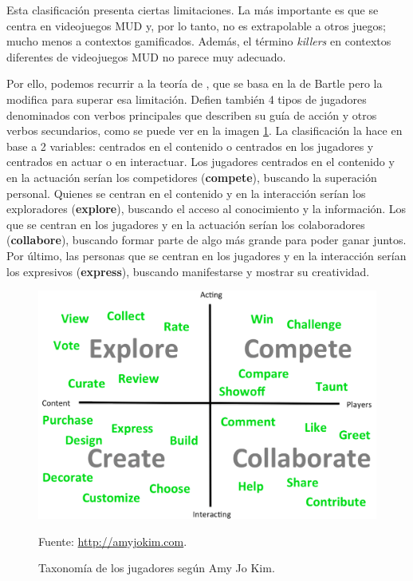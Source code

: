 Esta clasificación presenta ciertas limitaciones. 
%
La más importante es que se centra en videojuegos \gls{MUD} y, por lo tanto, no es extrapolable a otros juegos; mucho menos a contextos gamificados.
%
Además, el término \textit{killers} en contextos diferentes de videojuegos \gls{MUD} no parece muy adecuado.


%
Por ello, podemos recurrir a la teoría de \cite{AmyJoKim}, que se basa en la de Bartle pero la modifica para superar esa limitación.
%
Defien también 4 tipos de jugadores denominados con verbos principales que describen su guía de acción y otros verbos secundarios, como se puede ver en la imagen \ref{fig::AmyJoKim}.
%
La clasificación la hace en base a 2 variables: centrados en el contenido o centrados en los jugadores y centrados en actuar o en interactuar.
%
Los jugadores centrados en el contenido y en la actuación serían los competidores (\textbf{compete}), buscando la superación personal.
%
Quienes se centran en el contenido y en la interacción serían los exploradores (\textbf{explore}), buscando el acceso al conocimiento y la información.
%
Los que se centran en los jugadores y en la actuación serían los colaboradores (\textbf{collabore}), buscando formar parte de algo más grande para poder ganar juntos.
%
Por último, las personas que se centran en los jugadores y en la interacción serían los expresivos (\textbf{express}), buscando manifestarse y mostrar su creatividad.

\begin{figure}[hbt]
\begin{center}
\includegraphics[scale=0.25]{img/AmyJoKim.png}
\caption{Taxonomía de los jugadores según Amy Jo Kim.}
\label{fig::AmyJoKim}
\vspace{-0.25cm}
\small{Fuente: \url{http://amyjokim.com}.}
\end{center}
\end{figure}


